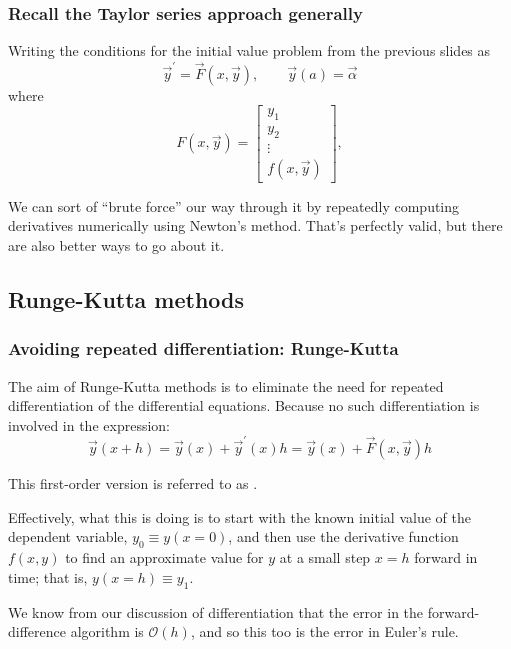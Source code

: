 \documentclass[hyperref={colorlinks=true}]{beamer}
\begin{document}
\begin{frame}%
  \frametitle{Recall the Taylor series approach generally}

  Writing the conditions for the initial value problem from the previous slides as
  \begin{equation}
    \vec{y}^{\prime} = \vec{F}(x, \vec{y}), \qquad \vec{y}(a) = \vec{\alpha}
  \end{equation}
  where 
  \begin{equation}
           F(x,\vec{y}) = \left[\begin{array}{c}
                             y_1 \\
                             y_2 \\
                             \vdots \\
                             f(x,\vec{y})
                           \end{array}\right],                      
  \end{equation}

  
  We can sort of ``brute force'' our way through it by repeatedly computing derivatives numerically using Newton's method. That's perfectly valid, but there are also better ways to go about it.

\end{frame}

\subsection[Runge-Kutta methods]{Runge-Kutta methods}

\begin{frame}%
  \frametitle{Avoiding repeated differentiation: Runge-Kutta}

  The aim of Runge-Kutta methods is to eliminate the need for repeated differentiation of the differential equations. Because no such differentiation is involved in the  expression:
  \begin{equation}
    \vec{y}(x + h) = \vec{y}(x) + \vec{y}^{\prime}(x)h = \vec{y}(x) + \vec{F}(x, \vec{y})h
  \end{equation}
  
  This first-order version is referred to as .
  
  \mysp
  
  Effectively, what this is doing is to start with the known initial value of the dependent variable, $y_0 \equiv y(x = 0)$, and then use the derivative function $f(x,y)$ to find an approximate value for $y$ at a small step $x = h$ forward in time; that is, $y(x = h) \equiv y_1$. 
  
  \mysp
  
  We know from our discussion of differentiation that the error in the forward-difference algorithm is $\mathcal{O}(h)$, and so this too is the error in Euler's rule.

\end{frame}
\end{document}
